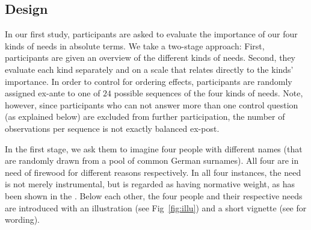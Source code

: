 \documentclass[10pt,letterpaper]{article}
\begin{document}
\subsection*{Design}\label{sec:study_1_design}
In our first study, participants are asked to evaluate the importance of our four kinds of needs in absolute terms.
We take a two-stage approach:
First, participants are given an overview of the different kinds of needs.
Second, they evaluate each kind separately and on a scale that relates directly to the kinds' importance.
In order to control for ordering effects, participants are randomly assigned ex-ante to one of $24$ possible sequences of the four kinds of needs.
Note, however, since participants who can not answer more than one control question (as explained below) are excluded from further participation, the number of observations per sequence is not exactly balanced ex-post.

In the first stage, we ask them to imagine four people with different names (that are randomly drawn from a pool of common German surnames).
All four are in need of firewood for different reasons respectively.
In all four instances, the need is not merely instrumental, but is regarded as having normative weight, as has been shown in the .
Below each other, the four people and their respective needs are introduced with an illustration (see Fig~\ref{fig:illu}) and a short vignette (see  for wording).
\end{document}
